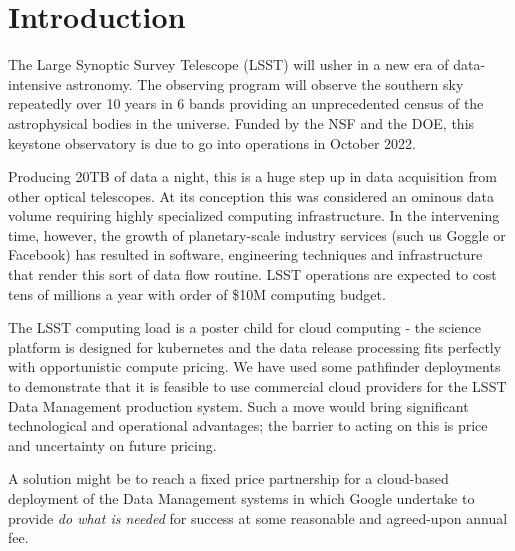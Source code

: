 \section{Introduction}
The Large Synoptic Survey Telescope (\gls{LSST}) will usher in a new era of data-intensive astronomy. The observing program will observe the southern sky repeatedly over 10 years in 6 bands providing an unprecedented census of the astrophysical bodies in the universe.  Funded by the \gls{NSF} and the \gls{DOE}, this keystone observatory is due to go into operations in October 2022.

Producing 20TB of data a night, this is a huge step up in data acquisition from other optical telescopes. At its conception this was considered an ominous data volume requiring highly specialized computing infrastructure. In the intervening time, however, the growth of planetary-scale industry services (such us Goggle or Facebook) has resulted in software, engineering techniques and infrastructure that render this sort of data flow routine. \gls{LSST}  operations are expected to cost tens of millions a year with order of \$10M computing budget.

The LSST computing load is a poster child for cloud computing - the science platform is designed for kubernetes and the
data release processing fits perfectly with opportunistic compute pricing.
We have used some pathfinder deployments to demonstrate that it is feasible to use commercial cloud providers for the \gls{LSST} \gls{Data Management} production system. Such a move would bring significant technological and operational advantages; the barrier to acting on this is price and uncertainty on future pricing.

A solution might be to reach a fixed price partnership for a cloud-based deployment of the \gls{Data Management} systems in which Google undertake to provide \emph{do what is needed} for success at some reasonable and agreed-upon annual fee.






